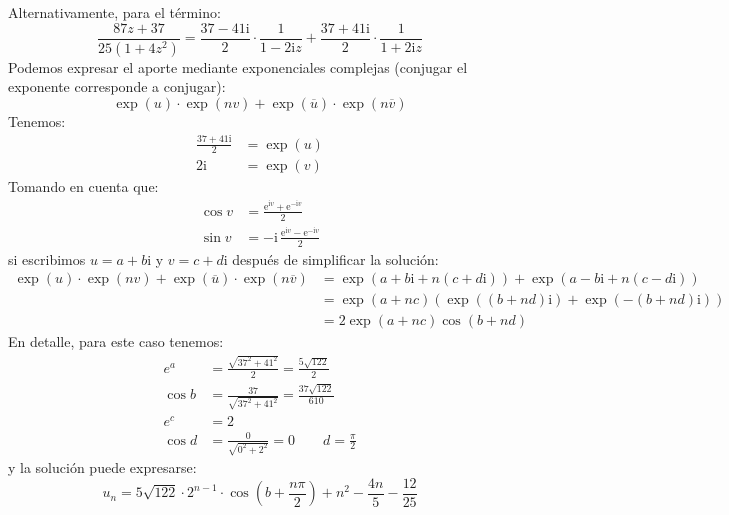   Alternativamente,
  para el término:
  \begin{equation*}
      \frac{87 z + 37}{25 (1 + 4 z^2)}
      = \frac{37 - 41 \mathrm{i}}{2} \cdot \frac{1}{1 - 2 \mathrm{i} z}
	  + \frac{37 + 41 \mathrm{i}}{2} \cdot \frac{1}{1 + 2 \mathrm{i} z}
  \end{equation*}
  Podemos expresar el aporte mediante exponenciales complejas%
  (conjugar el exponente corresponde a conjugar):
  \begin{equation*}
    \exp(u) \cdot \exp(n v)
      + \exp(\overline{u}) \cdot \exp(n \overline{v})
  \end{equation*}
  Tenemos:
  \begin{align*}
    \frac{37 + 41 \mathrm{i}}{2}
      &= \exp(u) \\
    2 \mathrm{i}
      &= \exp (v)
  \end{align*}
  Tomando en cuenta que:%
  \begin{align*}
    \cos v
      &= \frac{\mathrm{e}^{\mathrm{i} v}
		  + \mathrm{e}^{ - \mathrm{i} v}}
	      {2} \\
    \sin v
      &= - \mathrm{i} \, \frac{\mathrm{e}^{\mathrm{i} v}
				 - \mathrm{e}^{ - \mathrm{i} v}}
			      {2}
  \end{align*}
  si escribimos \(u = a + b \mathrm{i}\) y \(v = c + d \mathrm{i}\)
  después de simplificar la solución:
  \begin{align*}
    \exp(u) \cdot \exp(n v)
      + \exp(\overline{u}) \cdot \exp(n \overline{v})
      &= \exp(a + b \mathrm{i} + n (c + d \mathrm{i}))
	   + \exp(a - b \mathrm{i} + n (c - d \mathrm{i})) \\
      &= \exp(a + n c) (\exp((b + n d) \mathrm{i})
			  + \exp(- (b + n d) \mathrm{i})) \\
      &= 2 \exp(a + n c) \cos (b + n d)
  \end{align*}
  En detalle,
  para este caso tenemos:
  \begin{align*}
    e^a
      &= \frac{\sqrt{37^2 + 41^2}}{2}
       = \frac{5 \sqrt{122}}{2} \\
    \cos b
      &= \frac{37}{\sqrt{37^2 + 41^2}}
       = \frac{37 \sqrt{122}}{610} \\
    e^c
      &= 2 \\
    \cos d
      &= \frac{0}{\sqrt{0^2 + 2^2}}
       = 0
      \qquad d = \frac{\pi}{2}
  \end{align*}
  y la solución puede expresarse:
  \begin{equation*}
    u_n
      = 5 \sqrt{122} \cdot 2^{n - 1}
	  \cdot \cos \left( b + \frac{n \pi}{2} \right)
	   + n^2
	   - \frac{4 n}{5}
	   - \frac{12}{25}
\end{equation*}



